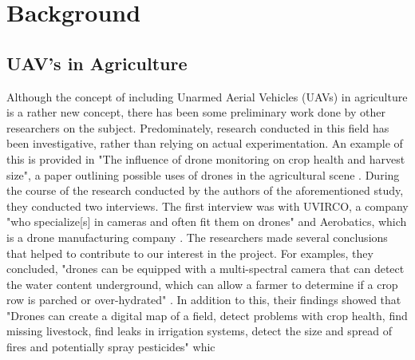 \section{Background}
\subsection{UAV's in Agriculture}
Although the concept of including Unarmed Aerial Vehicles (UAVs) in agriculture is a rather new concept, there has been some preliminary work done by other researchers on the subject.
Predominately, research conducted in this field has been investigative, rather than relying on actual experimentation.
An example of this is provided in "The influence of drone monitoring on crop health and harvest size", a paper outlining possible uses of drones in the agricultural scene \cite{Reinecke2017}.
During the course of the research conducted by the authors of the aforementioned study, they conducted two interviews. 
The first interview was with UVIRCO, a company "who specialize[s] in cameras and often fit them on drones" and Aerobatics, which is a drone manufacturing company \cite{Reinecke2017}.
The researchers made several conclusions that helped to contribute to our interest in the project.
For examples, they concluded, "drones can be equipped with a multi-spectral camera that can detect the water content underground, which can allow a farmer to determine if a crop row is parched or over-hydrated" \cite{Reinecke2017}.
In addition to this, their findings showed that "Drones can create a digital map of a field, detect problems with crop health, find missing livestock, find leaks in irrigation systems, detect the size and spread of fires and potentially spray pesticides" whic 
